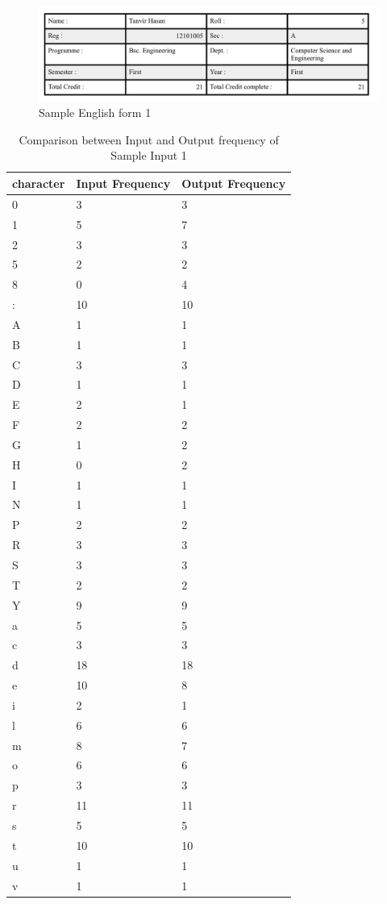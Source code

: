 \begin{figure}[H]
\centering
\includegraphics[width=1\textwidth]{form1.png}
\caption {Sample English form 1}
\label {fig:form1}
\end{figure}

\begin{table}[H]
\centering
\begin{tabular}{|p{2cm}|p{2cm}|p{2cm}|}
\hline
character & Input Frequency & Output Frequency \\
\hline
0 & 3  & 3 \\
\hline
1 & 5  & 7 \\
\hline
2 & 3  & 3 \\
\hline
5 & 2  & 2 \\
\hline
8 & 0  & 4 \\
\hline
: & 10 & 10 \\
\hline
A & 1  & 1 \\
\hline
B & 1  & 1 \\
\hline
C & 3  & 3 \\
\hline
D & 1  & 1 \\
\hline
E & 2  & 1 \\
\hline
F & 2  & 2 \\
\hline
G & 1  & 2 \\
\hline
H & 0  & 2 \\
\hline
I & 1  & 1 \\
\hline
N & 1  & 1 \\
\hline
P & 2  & 2 \\
\hline
R & 3  & 3 \\
\hline
S & 3  & 3 \\
\hline
T & 2  & 2 \\
\hline
Y & 9  & 9 \\
\hline
a & 5  & 5 \\
\hline
c & 3  & 3 \\
\hline
d & 18 & 18 \\
\hline
e & 10 & 8 \\
\hline
i & 2  & 1 \\
\hline
l & 6  & 6 \\
\hline
m & 8  & 7 \\
\hline
o & 6  & 6 \\
\hline
p & 3  & 3 \\
\hline
r & 11 & 11 \\
\hline
s & 5  & 5 \\
\hline
t & 10 & 10 \\
\hline
u & 1  & 1 \\
\hline
v & 1  & 1 \\
\hline
\end{tabular}
\caption { Comparison between Input and Output frequency of Sample Input 1}
\label {tab:Table1}
\end{table}

